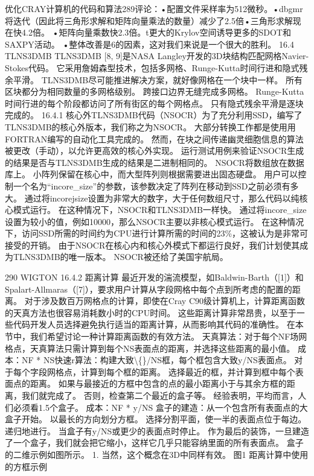 \documentclass[UTF8,11pt,a4paper,openany,fontset=fandol]{ctexbook}
\begin{document}
优化CRAY计算机的代码和算法289评论：•配置文件采样率为512微秒。•dbgmr将迭代（因此将三角形求解和矩阵向量乘法的数量）减少了2.5倍•三角形求解现在快4.2倍。 •矩阵向量乘数快2.3倍。t更大的Krylov空间诱导更多的SDOT和SAXPY活动。 •整体改善是6的因素，这对我们来说是一个很大的胜利。 16.4 TLNS3DMB TLNS3DMB [8, 9]是NASA Langley开发的3D块结构匹配网格Navier-Stokes代码。 它采用詹姆森型技术，包括多网格、Runge-Kutta时间行进和隐式残余平滑。 TLNS3DMB尽可能推进解决方案，就好像网格在一个块中一样。 所有区块都分为相同数量的多网格级别。 跨接口边界无缝完成多网格。 Runge-Kutta时间行进的每个阶段都访问了所有街区的每个网格点。 只有隐式残余平滑是逐块完成的。 16.4.1 核心外TLNS3DMB代码（NSOCR）为了充分利用SSD，编写了TLNS3DMB的核心外版本，我们称之为NSOCR。 大部分转换工作都是使用用FORTRAN编写的自动化工具完成的。 然而，在块之间传递幽灵细胞信息的算法被更改（手动），以允许更高效的核心外实现。 运行测试用例来验证NSOCR生成的结果是否与TLNS3DMB生成的结果是二进制相同的。 NSOCR将数组放在数据库上。 小阵列保留在核心中，而大型阵列则根据需要进出固态硬盘。 用户可以控制一个名为“incore\_size”的参数，该参数决定了阵列在移动到SSD之前必须有多大。 通过将incorejsize设置为非常大的数字，大于任何数组尺寸，那么代码以纯核心模式运行。 在这种情况下，NSOCR和TLNS3DMB一样快。 通过将incore\_size设置为较小的值，例如10000，那么NSOCR主要以非核心模式运行。 在这种情况下，访问SSD所需的时间约为CPU进行计算所需的时间的23\%，这被认为是非常可接受的开销。 由于NSOCR在核心内和核心外模式下都运行良好，我们计划使其成为TLNS3DMB的唯一版本。 NSOCR被还给了美国宇航局。

290 WIGTON 16.4.2 距离计算 最近开发的湍流模型，如Baldwin-Barth（[1]）和Spalart-Allmaras（[7]），要求用户计算从字段网格中每个点到所考虑的配置的距离。 对于涉及数百万网格点的计算，即使在Cray C90级计算机上，计算距离函数的天真方法也很容易消耗数小时的CPU时间。 这些距离计算非常昂贵，以至于一些代码开发人员选择避免执行适当的距离计算，从而影响其代码的准确性。 在本节中，我们希望讨论一种计算距离函数的有效方法。 天真算法：对于每个NF场网格点，天真算法只需计算到每个NS表面点的距离，并选择这些距离的最小值。 成本：NF * NS快速r算法：构建大致\textbackslash\{\}/NS框，每个框包含大致y/NS表面点。 对于每个字段网格点，计算到每个框的距离。 选择最近的框，并计算到框中每个表面点的距离。 如果与最接近的方框中包含的点的最小距离小于与其余方框的距离，我们就完成了。 否则，检查第二个最近的盒子等。 经验表明，平均而言，人们必须看1.5个盒子。 成本：NF * y/NS 盒子的建造：从一个包含所有表面点的大盒子开始。 以最长的方向划分方框。 选择分割平面，使一半的表面点位于每边。 递归地进行。 当盒子有y/NS或更少的表面点时停止。 作为最后的装饰，一旦建造了一个盒子，我们就会把它缩小，这样它几乎只能容纳里面的所有表面点。 盒子的二维示例如图所示。 1. 当然，这个概念在3D中同样有效。 图1 距离计算中使用的方框示例
\end{document}

